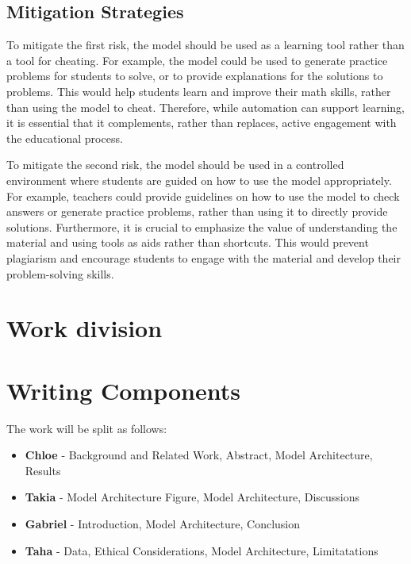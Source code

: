 \documentclass{article}
\begin{document}
\subsection{Mitigation Strategies}
To mitigate the first risk, the model should be used as a learning tool rather than a tool for cheating. For example, the model could be used to generate practice problems for students to solve, or to provide explanations for the solutions to problems. This would help students learn and improve their math skills, rather than using the model to cheat. Therefore, while automation can support learning, it is essential that it complements, rather than replaces, active engagement with the educational process.

To mitigate the second risk, the model should be used in a controlled environment where students are guided on how to use the model appropriately. For example, teachers could provide guidelines on how to use the model to check answers or generate practice problems, rather than using it to directly provide solutions. Furthermore, it is crucial to emphasize the value of understanding the material and using tools as aids rather than shortcuts. This would prevent plagiarism and encourage students to engage with the material and develop their problem-solving skills.

\section{Work division}

\section*{Writing Components}
The work will be split as follows:
\begin{itemize}
  \item \textbf{Chloe} - Background and Related Work, Abstract, Model Architecture, Results
  \item \textbf{Takia} - Model Architecture Figure, Model Architecture, Discussions
  \item \textbf{Gabriel} - Introduction, Model Architecture, Conclusion
  \item \textbf{Taha} - Data, Ethical Considerations, Model Architecture, Limitatations
\end{itemize}
\end{document}
